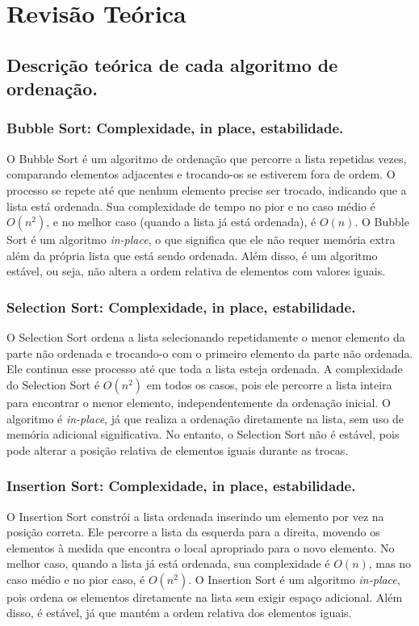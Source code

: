 \documentclass[a4paper,12pt]{article}
\begin{document}
\section{Revisão Teórica}
\subsection{Descrição teórica de cada algoritmo de ordenação.}
\subsubsection{Bubble Sort: Complexidade, in place, estabilidade.}
O Bubble Sort é um algoritmo de ordenação que percorre a lista repetidas vezes, comparando elementos adjacentes e trocando-os se estiverem fora de ordem. O processo se repete até que nenhum elemento precise ser trocado, indicando que a lista está ordenada. Sua complexidade de tempo no pior e no caso médio é \(O(n^2)\), e no melhor caso (quando a lista já está ordenada), é \(O(n)\). O Bubble Sort é um algoritmo \textit{in-place}, o que significa que ele não requer memória extra além da própria lista que está sendo ordenada. Além disso, é um algoritmo estável, ou seja, não altera a ordem relativa de elementos com valores iguais.
\subsubsection{Selection Sort: Complexidade, in place, estabilidade.}
O Selection Sort ordena a lista selecionando repetidamente o menor elemento da parte não ordenada e trocando-o com o primeiro elemento da parte não ordenada. Ele continua esse processo até que toda a lista esteja ordenada. A complexidade do Selection Sort é \(O(n^2)\) em todos os casos, pois ele percorre a lista inteira para encontrar o menor elemento, independentemente da ordenação inicial. O algoritmo é \textit{in-place}, já que realiza a ordenação diretamente na lista, sem uso de memória adicional significativa. No entanto, o Selection Sort não é estável, pois pode alterar a posição relativa de elementos iguais durante as trocas.
\subsubsection{Insertion Sort: Complexidade, in place, estabilidade.}
O Insertion Sort constrói a lista ordenada inserindo um elemento por vez na posição correta. Ele percorre a lista da esquerda para a direita, movendo os elementos à medida que encontra o local apropriado para o novo elemento. No melhor caso, quando a lista já está ordenada, sua complexidade é \(O(n)\), mas no caso médio e no pior caso, é \(O(n^2)\). O Insertion Sort é um algoritmo \textit{in-place}, pois ordena os elementos diretamente na lista sem exigir espaço adicional. Além disso, é estável, já que mantém a ordem relativa dos elementos iguais.
\end{document}
